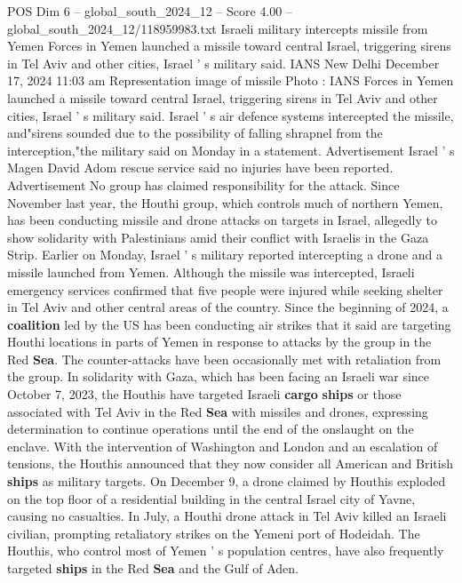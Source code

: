 \begin{textsample}{POS Dim 6 – global\_south\_2024\_12 – Score 4.00 – global\_south\_2024\_12/118959983.txt}  \label{ex:f6_pos_429}
Israeli military intercepts missile from Yemen Forces in Yemen launched a missile toward central Israel, triggering sirens in Tel Aviv and other cities, Israel ' s military said.
IANS New Delhi December 17, 2024 11:03 am Representation image of missile Photo : IANS Forces in Yemen launched a missile toward central Israel, triggering sirens in Tel Aviv and other cities, Israel ' s military said.
Israel ' s air defence systems intercepted the missile, and"sirens sounded due to the possibility of falling shrapnel from the interception,"the military said on Monday in a statement.
Advertisement Israel ' s Magen David Adom rescue service said no injuries have been reported.
Advertisement No group has claimed responsibility for the attack.
Since November last year, the Houthi group, which controls much of northern Yemen, has been conducting missile and drone attacks on targets in Israel, allegedly to show solidarity with Palestinians amid their conflict with Israelis in the Gaza Strip.
Earlier on Monday, Israel ' s military reported intercepting a drone and a missile launched from Yemen.
Although the missile was intercepted, Israeli emergency services confirmed that five people were injured while seeking shelter in Tel Aviv and other central areas of the country.
Since the beginning of 2024, a \textbf{coalition} led by the US has been conducting air strikes that it said are targeting Houthi locations in parts of Yemen in response to attacks by the group in the Red \textbf{Sea}.
The counter-attacks have been occasionally met with retaliation from the group.
In solidarity with Gaza, which has been facing an Israeli war since October 7, 2023, the Houthis have targeted Israeli \textbf{cargo} \textbf{ships} or those associated with Tel Aviv in the Red \textbf{Sea} with missiles and drones, expressing determination to continue operations until the end of the onslaught on the enclave.
With the intervention of Washington and London and an escalation of tensions, the Houthis announced that they now consider all American and British \textbf{ships} as military targets.
On December 9, a drone claimed by Houthis exploded on the top floor of a residential building in the central Israel city of Yavne, causing no casualties.
In July, a Houthi drone attack in Tel Aviv killed an Israeli civilian, prompting retaliatory strikes on the Yemeni port of Hodeidah.
The Houthis, who control most of Yemen ' s population centres, have also frequently targeted \textbf{ships} in the Red \textbf{Sea} and the Gulf of Aden.

\end{textsample}
